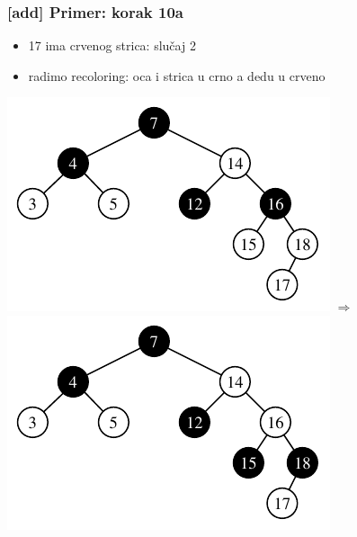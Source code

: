 \documentclass[compress]{beamer}
\begin{document}
\begin{frame}[fragile]
  \frametitle{[add] Primer: korak 10a}
  \begin{itemize}
    \item 17 ima crvenog strica: slučaj 2
    \item radimo recoloring: oca i strica u crno a dedu u crveno
  \end{itemize}
  \begin{center}
    \includegraphics[scale=0.8]{asp-11-add-15.pdf} $\Rightarrow$
    \includegraphics[scale=0.8]{asp-11-add-16.pdf}
  \end{center}
\end{frame}
\end{document}
